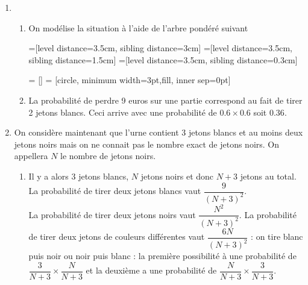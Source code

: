 \documentclass[11pt,fleqn, openany]{book} %
\begin{document}
\begin{solution}\hspace{0pt}


\begin{enumerate} 
\item 
\begin{enumerate}
\item On modélise la situation à l'aide de l'arbre pondéré suivant



=[level distance=3.5cm, sibling distance=3cm]
=[level distance=3.5cm, sibling distance=1.5cm]
=[level distance=3.5cm, sibling distance=0.3cm]

 = []
 = [circle, minimum width=3pt,fill, inner sep=0pt]


\begin{center}
\end{center}

\item La probabilité de perdre 9 euros sur une partie correspond au fait de tirer 2 jetons blancs. Ceci arrive avec une probabilité de $0.6 \times 0.6$ soit $0.36$.\end{enumerate}
\item On considère maintenant que l'urne contient 3 jetons blancs et au moins deux jetons noirs
mais on ne connait pas le nombre exact de jetons noirs. On appellera $N$ le nombre de jetons
noirs.
\begin{enumerate} \item Il y a alors 3 jetons blancs, $N$ jetons noirs et donc $N+3$ jetons au total. La probabilité de tirer deux jetons blancs vaut $\dfrac{9}{(N+3)^2}$. \\ La probabilité de tirer deux jetons noirs vaut $\dfrac{N^2}{(N+3)^2}$. La probabilité de tirer deux jetons de couleurs différentes vaut $\dfrac{6N}{(N+3)^2}$ : on tire blanc puis noir ou noir puis blanc : la première possibilité à une probabilité de $\dfrac{3}{N+3} \times \dfrac{N}{N+3}$ et la deuxième a une probabilité de $\dfrac{N}{N+3} \times \dfrac{3}{N+3}$.


\end{enumerate}
\end{enumerate}
\end{solution}
\end{document}
